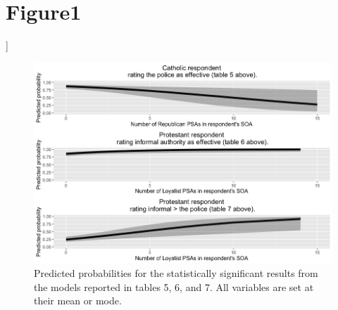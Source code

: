 \documentclass[12pt,letterpaper]{article}
\begin{document}
	\section*{Figure1}
	]
\begin{figure}[htbp]
	\centering
	\includegraphics[width=\textwidth]{figure1.jpeg}
	\caption{Predicted probabilities for the statistically significant results from the models reported in tables 5, 6, and 7. All variables are set at their mean or mode.}
	\label{fig:predicted_probabilities}
\end{figure}
\end{document}
